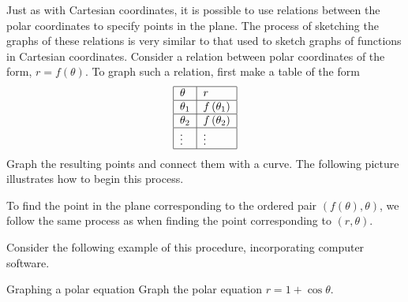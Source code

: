 Just as with Cartesian coordinates, it is possible to use
relations between the polar coordinates to specify points in the plane. The
process of sketching the graphs of these relations is very similar to that used to sketch
graphs of functions in Cartesian coordinates. Consider a relation between polar coordinates of the form, $r=f\left( \theta \right)$. To graph such a relation, first make a table of
the form 
\begin{equation*}
\begin{tabular}{|l|l|}
\hline
$\theta $ & $r$ \\ \hline
$\theta _{1}$ & $f\left( \theta _{1}\right) $ \\ \hline
$\theta _{2}$ & $f\left( \theta _{2}\right) $ \\ \hline
$\vdots $ & $\vdots $ \\ \hline
\end{tabular}
\end{equation*}
Graph the resulting points and connect them with a curve. The
following picture illustrates how to begin this process.

\begin{center}
\end{center}

To find the point in the plane corresponding to the ordered pair $\left( f\left(
\theta \right) ,\theta \right) $, we follow the same process as when finding the point corresponding to $\left( r, \theta \right)$.

Consider the following example of this procedure, incorporating computer software.

\begin{example}{Graphing a polar equation}{}
Graph the polar equation $r=1+\cos \theta$.
\end{example}

